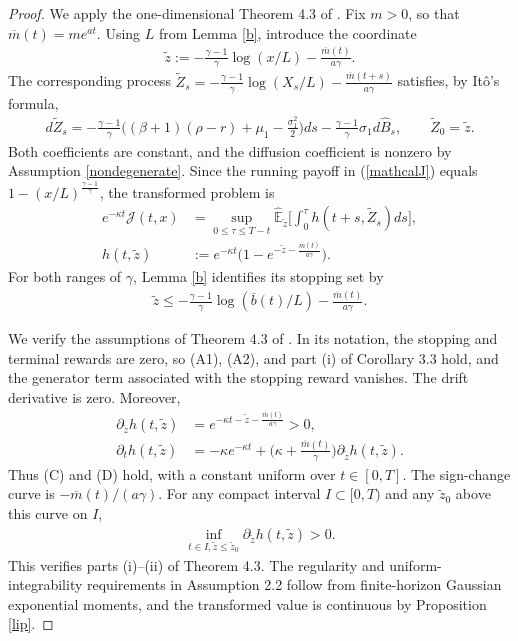 \documentclass[a4paper,11pt]{amsart}
\numberwithin{equation}{section}
\begin{document}
{\begin{proof}
\color{black}
We apply the one-dimensional Theorem 4.3 of \citet{de2019lipschitz}. Fix $m>0$, so that $\overline m(t)=me^{at}$. Using $L$ from Lemma \ref{b}, introduce the coordinate
\begin{align*}
\widetilde z:=-\frac{\gamma-1}{\gamma}\log(x/L)-\frac{\overline m(t)}{a\gamma}.
\end{align*}
The corresponding process $\widetilde Z_s=-\frac{\gamma-1}{\gamma}\log(X_s/L)-\frac{\overline m(t+s)}{a\gamma}$ satisfies, by It\^o's formula,
\begin{align*}
d\widetilde Z_s=-\frac{\gamma-1}{\gamma}\bigg((\beta+1)(\rho-r)+\mu_1-\frac{\sigma_1^2}{2}\bigg)ds-\frac{\gamma-1}{\gamma}\sigma_1d\widehat B_s,\qquad\widetilde Z_0=\widetilde z.
\end{align*}
Both coefficients are constant, and the diffusion coefficient is nonzero by Assumption \ref{nondegenerate}. Since the running payoff in (\ref{mathcalJ}) equals $1-(x/L)^{\frac{\gamma-1}{\gamma}}$, the transformed problem is
\begin{align*}
e^{-\kappa t}\mathcal J(t,x)&=\sup_{0\leq\tau\leq T-t}\widehat{\mathbb E}_{\widetilde z}\bigg[\int_0^\tau h(t+s,\widetilde Z_s)ds\bigg],\\
h(t,\widetilde z)&:=e^{-\kappa t}\Big(1-e^{-\widetilde z-\frac{\overline m(t)}{a\gamma}}\Big).
\end{align*}
For both ranges of $\gamma$, Lemma \ref{b} identifies its stopping set by
\begin{align*}
\widetilde z\leq-\frac{\gamma-1}{\gamma}\log(\overline b(t)/L)-\frac{\overline m(t)}{a\gamma}.
\end{align*}
 

We verify the assumptions of Theorem 4.3 of \cite{de2019lipschitz}. In its notation, the stopping and terminal rewards are zero, so (A1), (A2), and part (i) of Corollary 3.3 hold, and the generator term associated with the stopping reward vanishes. The drift derivative is zero. Moreover,
\begin{align*}
\partial_{\widetilde z}h(t,\widetilde z)&=e^{-\kappa t-\widetilde z-\frac{\overline m(t)}{a\gamma}}>0,\\
\partial_t h(t,\widetilde z)&=-\kappa e^{-\kappa t}+\Big(\kappa+\frac{\overline m(t)}{\gamma}\Big)\partial_{\widetilde z}h(t,\widetilde z).
\end{align*}
Thus (C) and (D) hold, with a constant uniform over $t\in[0,T]$. The sign-change curve is $-\overline m(t)/(a\gamma)$. For any compact interval $I\subset[0,T)$ and any $\widetilde z_0$ above this curve on $I$,
\begin{align*}
\inf_{t\in I,\widetilde z\leq\widetilde z_0}\partial_{\widetilde z}h(t,\widetilde z)>0.
\end{align*}
This verifies parts (i)--(ii) of Theorem 4.3. The regularity and uniform-integrability requirements in Assumption 2.2 follow from finite-horizon Gaussian exponential moments, and the transformed value is continuous by Proposition \ref{lip}. 


\end{proof}}
\end{document}
